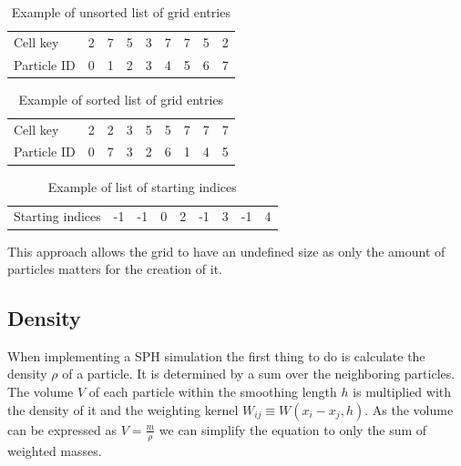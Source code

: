 \documentclass[intern]{cgMA}
\begin{document}
    \begin{table}[ht]
        \centering
        \caption{Example of unsorted list of grid entries }
        \begin{tabular}{ l c c c c c c c c }
            Cell key    & 2 & 7 & 5 & 3 & 7 & 7 & 5 & 2 \\ 
            Particle ID & 0 & 1 & 2 & 3 & 4 & 5 & 6 & 7 \\   
        \end{tabular}
        \label{tab:unsorted}
    \end{table}

    \begin{table}[ht]
        \centering
        \caption{Example of sorted list of grid entries }
        \begin{tabular}{ l c c c c c c c c }
            Cell key    & 2 & 2 & 3 & 5 & 5 & 7 & 7 & 7 \\ 
            Particle ID & 0 & 7 & 3 & 2 & 6 & 1 & 4 & 5 \\   
        \end{tabular}
        \label{tab:sorted}
    \end{table}

    \begin{table}[ht]
        \centering
        \caption{Example of list of starting indices }
        \begin{tabular}{ l c c c c c c c c }
            Starting indices    & -1 & -1 & 0 & 2 & -1 & 3 & -1 & 4 \\ 
        \end{tabular}
        \label{tab:indices}
    \end{table}

    This approach allows the grid to have an undefined size as only the amount of particles matters for the creation of it. 

    \subsection{Density}  
    When implementing a SPH simulation the first thing to do is calculate the density $\rho$ of a particle. It is determined by a sum over the neighboring particles. The volume $V$ of each particle within the smoothing length $h$ is multiplied with the density of it and the weighting kernel $ W_{ij} \equiv W(x_i - x_j, h)$. As the volume can be expressed as $V = \frac{m}{\rho}$ we can simplify the equation to only the sum of weighted masses. \cite{wcsph}
\end{document}
